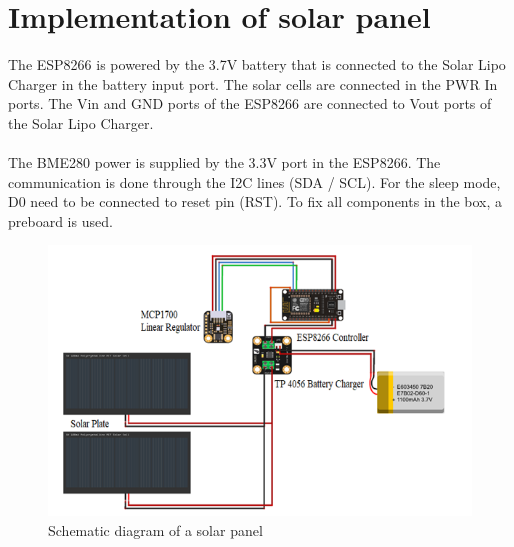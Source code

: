 \section{Implementation of solar panel}
The ESP8266 is powered by the 3.7V battery that is connected to the Solar Lipo Charger in the battery input port. The solar cells are connected in the PWR In ports. The Vin and GND ports of the ESP8266 are connected to Vout ports of the Solar Lipo Charger.\\\\
The BME280 power is supplied by the 3.3V port in the ESP8266. The communication is done through the I2C lines (SDA / SCL). For the sleep mode, D0 need to be connected to reset pin (RST). To fix all components in the box, a preboard is used.
\begin{figure}[H]
  \centering
  \includegraphics[width=6in]{36}
  \caption{Schematic diagram of a solar panel}\label{fig36}
\end{figure}
